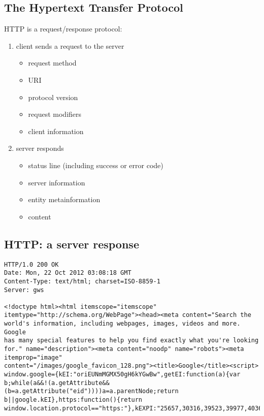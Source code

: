 \documentclass[xga]{xdvislides}
\begin{document}
\subsection{The Hypertext Transfer Protocol}
HTTP is a request/response protocol:
\begin{enumerate}
	\item client sends a request to the server
		\begin{itemize}
			\item request method
			\item URI
			\item protocol version
			\item request modifiers
			\item client information
		\end{itemize}
	\item server responds
		\begin{itemize}
			\item status line (including success or error code)
			\item server information
			\item entity metainformation
			\item content
		\end{itemize}
\end{enumerate}

\subsection{HTTP: a server response}
\begin{verbatim}
HTTP/1.0 200 OK
Date: Mon, 22 Oct 2012 03:08:18 GMT
Content-Type: text/html; charset=ISO-8859-1
Server: gws

<!doctype html><html itemscope="itemscope"
itemtype="http://schema.org/WebPage"><head><meta content="Search the
world's information, including webpages, images, videos and more. Google
has many special features to help you find exactly what you're looking
for." name="description"><meta content="noodp" name="robots"><meta
itemprop="image"
content="/images/google_favicon_128.png"><title>Google</title><script>
window.google={kEI:"oriEUNmMGMX50gH6kYGwBw",getEI:function(a){var
b;while(a&&!(a.getAttribute&&(b=a.getAttribute("eid"))))a=a.parentNode;return
b||google.kEI},https:function(){return
window.location.protocol=="https:"},kEXPI:"25657,30316,39523,39977,40362
\end{verbatim}
\end{document}
